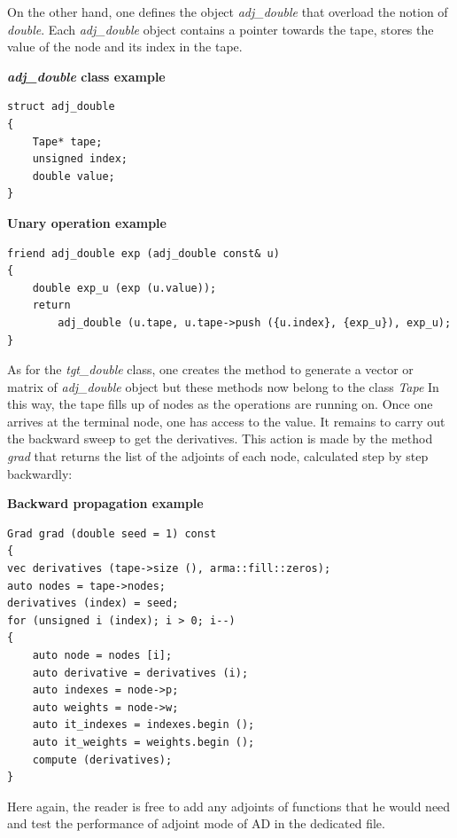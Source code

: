 \documentclass {article}
\begin{document}
			On the other hand, one defines the object \textit{adj\_double} that overload the notion of \textit{double}.
			Each \textit{adj\_double} object contains a pointer towards the tape, stores the value of the node and its index in the tape.
			
			\begin{frameth}
				\textbf{ \textit{adj\_double} class example}
\begin{lstlisting}		
struct adj_double
{
	Tape* tape;
	unsigned index;
	double value;
}
\end{lstlisting}
			\end{frameth}
			
			\begin{frameth}
				\textbf{Unary operation example}
\begin{lstlisting}		
friend adj_double exp (adj_double const& u)
{
	double exp_u (exp (u.value));
	return 
		adj_double (u.tape, u.tape->push ({u.index}, {exp_u}), exp_u);
}
\end{lstlisting}
			\end{frameth}
			
As for the \textit{tgt\_double} class, one creates the method to generate a vector or matrix of \textit{adj\_double} object but these methods now belong to the class \textit{Tape}
In this way, the tape fills up of nodes as the operations are running on. Once one arrives at the terminal node, one has access to the value.
It remains to carry out the backward sweep to get the derivatives. This action is made by the method \textit{grad} that returns the list of the adjoints of each node, calculated step by step backwardly:

			\begin{frameth}
				\textbf{Backward propagation example}
\begin{lstlisting}		
Grad grad (double seed = 1) const
{
vec derivatives (tape->size (), arma::fill::zeros);
auto nodes = tape->nodes;
derivatives (index) = seed;
for (unsigned i (index); i > 0; i--)
{
	auto node = nodes [i];
	auto derivative = derivatives (i);
	auto indexes = node->p;
	auto weights = node->w;
	auto it_indexes = indexes.begin ();
	auto it_weights = weights.begin ();
	compute (derivatives);
}
\end{lstlisting}
			\end{frameth}
			
Here again, the reader is free to add any adjoints of functions that he would need and test the performance of adjoint mode of AD in the dedicated file.
			
\end{document}
